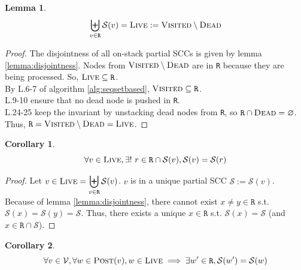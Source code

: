 \documentclass[a4 paper, 12pt]{article}
\newtheorem{lemma}{Lemma}
\newtheorem{corollary}{Corollary}[lemma]
\begin{document}
\begin{lemma}
    \begin{equation*}
        \biguplus_{v \in \texttt{R}} \mathcal{S}(v) = \textsc{Live} := \textsc{Visited} \setminus \textsc{Dead}
    \end{equation*}
\end{lemma}

\begin{proof}
    The disjointness of all on-stack partial SCCs is given by lemma \ref{lemma:disjointness}. Nodes from $\textsc{Visited} \setminus \textsc{Dead}$ are in \texttt{R} because they are being processed. So, $\textsc{Live} \subseteq \texttt{R}$.\\
    By L.6-7 of algorithm \ref{alg:seqsetbased}, $\textsc{Visited} \subseteq \texttt{R}$.\\
    L.9-10 ensure that no dead node is pushed in \texttt{R}.\\
    L.24-25 keep the invariant by unstacking dead nodes from \texttt{R}, so $\texttt{R} \cap \textsc{Dead} = \varnothing$. Thus, $\texttt{R} = \textsc{Visited} \setminus \textsc{Dead} = \textsc{Live}$.
\end{proof}

\begin{corollary}\label{cor:cor1}
    \begin{equation*}
        \forall v \in \textsc{Live}, \exists!~r \in \texttt{R} \cap \mathcal{S}(v), \mathcal{S}(v) = \mathcal{S}(r)
    \end{equation*}
\end{corollary}
\begin{proof}
    Let $v \in \textsc{Live} = \displaystyle{\biguplus_{v \in \texttt{R}} \mathcal{S}(v)}$. $v$ is in a unique partial SCC $\mathscr{S} := \mathcal{S}(v)$. Because of lemma \ref{lemma:disjointness}, there cannot exist $x \neq y \in \texttt{R}$ s.t. $\mathcal{S}(x) = \mathcal{S}(y) = \mathscr{S}$. Thus, there exists a unique $x \in \texttt{R}$ s.t. $\mathcal{S}(x) = \mathscr{S}$ (and $x\in \texttt{R} \cap \mathscr{S}$).
\end{proof}

\begin{corollary}\label{cor:cor2}
    \begin{equation*}
        \forall v \in \mathcal{V}, \forall w \in \textsc{Post}(v), w \in \textsc{Live} \implies \exists w' \in \texttt{R}, \mathcal{S}(w') = \mathcal{S}(w)
    \end{equation*}
\end{corollary}
\end{document}
